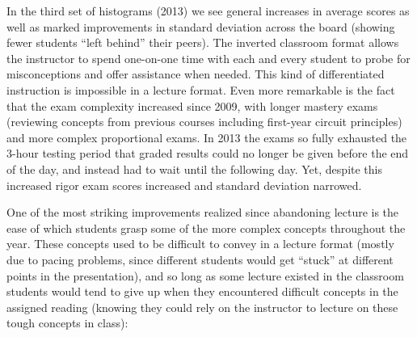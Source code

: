In the third set of histograms (2013) we see general increases in average scores as well as marked improvements in standard deviation across the board (showing fewer students ``left behind'' their peers).  The inverted classroom format allows the instructor to spend one-on-one time with each and every student to probe for misconceptions and offer assistance when needed.  This kind of differentiated instruction is impossible in a lecture format.  Even more remarkable is the fact that the exam complexity increased since 2009, with longer mastery exams (reviewing concepts from previous courses including first-year circuit principles) and more complex proportional exams.  In 2013 the exams so fully exhausted the 3-hour testing period that graded results could no longer be given before the end of the day, and instead had to wait until the following day.  Yet, despite this increased rigor exam scores increased and standard deviation narrowed.


\vskip 10pt

One of the most striking improvements realized since abandoning lecture is the ease of which students grasp some of the more complex concepts throughout the year.  These concepts used to be difficult to convey in a lecture format (mostly due to pacing problems, since different students would get ``stuck'' at different points in the presentation), and so long as some lecture existed in the classroom students would tend to give up when they encountered difficult concepts in the assigned reading (knowing they could rely on the instructor to lecture on these tough concepts in class):

